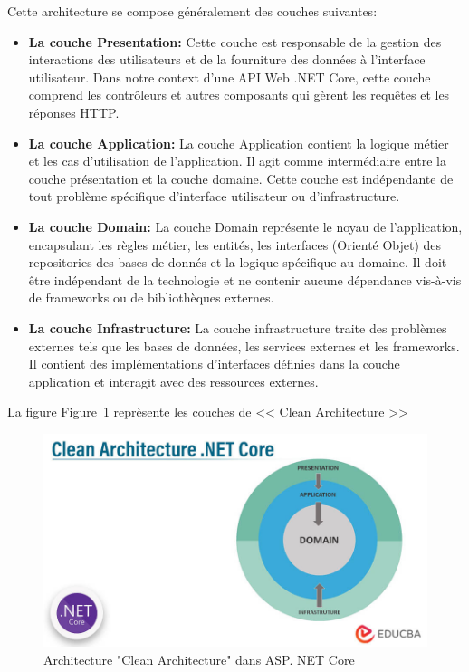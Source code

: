 \noindent
Cette architecture se compose généralement des couches suivantes: \\

\begin{itemize}
    \small\item \textbf{La couche Presentation: } Cette couche est responsable de la gestion des interactions des utilisateurs et de la fourniture des données à l'interface utilisateur. Dans notre context d'une API Web .NET Core, cette couche comprend les contrôleurs et autres composants qui gèrent les requêtes et les réponses HTTP.

    \small\item \textbf{La couche Application: } La couche Application contient la logique métier et les cas d’utilisation de l’application. Il agit comme intermédiaire entre la couche présentation et la couche domaine. Cette couche est indépendante de tout problème spécifique d’interface utilisateur ou d’infrastructure.
    \small\item \textbf{La couche Domain: } La couche Domain représente le noyau de l’application, encapsulant les règles métier, les entités, les interfaces (Orienté Objet) des repositories des bases de donnés et la logique spécifique au domaine. Il doit être indépendant de la technologie et ne contenir aucune dépendance vis-à-vis de frameworks ou de bibliothèques externes.

    \small\item \textbf{La couche Infrastructure: } La couche infrastructure traite des problèmes externes tels que les bases de données, les services externes et les frameworks. Il contient des implémentations d'interfaces définies dans la couche application et interagit avec des ressources externes.
\end{itemize}

\noindent
La figure Figure~\ref{fig:architecture} reprèsente les couches de << Clean Architecture >>

\begin{figure}[H]
\centering
\includegraphics[width=1\textwidth]{logos/clean_architecture.png}
\caption{Architecture "Clean Architecture" dans ASP. NET Core}
\label{fig:architecture}
\end{figure}

